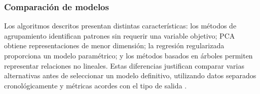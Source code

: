 \subsubsection{Comparación de modelos}
Los algoritmos descritos presentan distintas características: los métodos de agrupamiento identifican patrones sin requerir una variable objetivo; PCA obtiene representaciones de menor dimensión; la regresión regularizada proporciona un modelo paramétrico; y los métodos basados en árboles permiten representar relaciones no lineales. Estas diferencias justifican comparar varias alternativas antes de seleccionar un modelo definitivo, utilizando datos separados cronológicamente y métricas acordes con el tipo de salida \cite{hastie2009elements,cawley2010selection}.